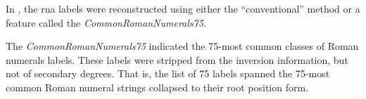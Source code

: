
In \textcite{napoleslopez2021augmentednet}, the \gls{rna}
labels were reconstructed using either the ``conventional''
method or a feature called the \emph{CommonRomanNumerals75}.

The \emph{CommonRomanNumerals75} indicated the 75-most
common classes of Roman numerals labels. These labels were
stripped from the inversion information, but not of
secondary degrees. That is, the list of 75 labels spanned
the 75-most common Roman numeral strings collapsed to their
root position form.
